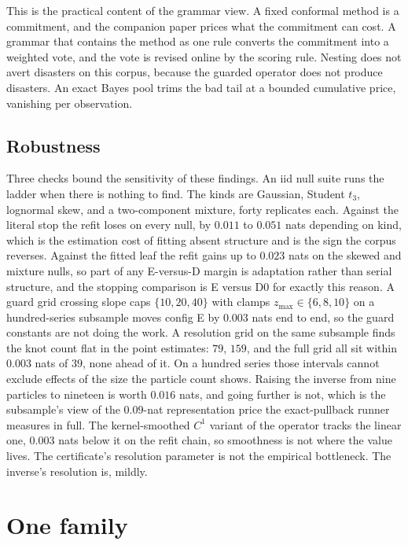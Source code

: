\documentclass[11pt]{article}
\theoremstyle{remark}
\begin{document}
This is the practical content of the grammar view. A fixed conformal method is
a commitment, and the companion paper prices what the commitment can cost. A grammar that
contains the method as one rule converts the commitment into a weighted vote, and the vote
is revised online by the scoring rule. Nesting does not avert disasters on this corpus,
because the guarded operator does not produce disasters. An exact Bayes pool trims the bad tail at a bounded cumulative price, vanishing per
observation.

\subsection{Robustness}\label{sec:robust}

Three checks bound the sensitivity of these findings. An iid null suite runs the ladder when there is nothing to find. The kinds are
Gaussian, Student $t_3$, lognormal skew, and a two-component mixture, forty
replicates each. Against the literal stop the refit loses on every null, by $0.011$
to $0.051$ nats depending on kind, which is the estimation cost of fitting absent
structure and is the sign the corpus reverses. Against the fitted leaf the refit
gains up to $0.023$ nats on the skewed and mixture nulls, so part of any
E-versus-D margin is adaptation rather than serial structure, and the stopping
comparison is E versus D0 for exactly this reason.
A guard grid crossing slope caps $\{10, 20, 40\}$ with clamps
$z_{\max} \in \{6, 8, 10\}$ on a hundred-series subsample moves config E by
$0.003$ nats end to end, so the guard constants are not doing the work. A resolution
grid on the same subsample finds the knot count flat in the point estimates: $79$,
$159$, and the full grid all sit within $0.003$ nats of $39$, none ahead of it. On a
hundred series those intervals cannot exclude effects of the size the particle count
shows. Raising the inverse from nine particles to nineteen is worth $0.016$ nats,
and going further is not, which is the subsample's view of the $0.09$-nat
representation price the exact-pullback runner measures in full. The
kernel-smoothed $C^1$ variant of the operator tracks the linear one, $0.003$ nats
below it on the refit chain, so smoothness is not where the value lives. The
certificate's resolution parameter is not the empirical bottleneck. The inverse's
resolution is, mildly.

\section{One family}\label{sec:family}
\end{document}
